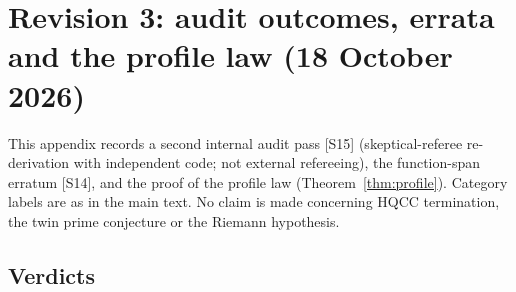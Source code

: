 \documentclass[11pt]{article}
\theoremstyle{definition}
\newcommand{\src}[1]{\textup{[S#1]}}
\begin{document}
\section{Revision 3: audit outcomes, errata and the profile law (18 October 2026)}\label{app:rev3}
This appendix records a second internal audit pass \src{15} (skeptical-referee re-derivation with independent code; not external refereeing),
the function-span erratum \src{14}, and the proof of the profile law (Theorem~\ref{thm:profile}). Category labels are as in the main text. No claim is made
concerning HQCC termination, the twin prime conjecture or the Riemann hypothesis.

\subsection{Verdicts}
\end{document}
